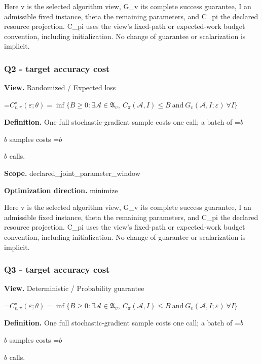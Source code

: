 \documentclass[10pt,a4paper]{article}
\newcommand{\AtlasMath}[1]{\par\begingroup\centering\setbox0=\hbox{$\displaystyle #1$}\ifdim\wd0>1.4\linewidth\typeout{ATLAS WIDE FORMULA: \the\wd0}\fi\ifdim\wd0>\linewidth\resizebox{\linewidth}{!}{\box0}\else\box0\fi\par\endgroup}
\newcommand{\AtlasInlineMath}[1]{\begingroup\setbox0=\hbox{$#1$}\ifdim\wd0>.4\linewidth\endgroup\AtlasMath{#1}\else\endgroup$#1$\fi}
\begin{document}
Here v is the selected algorithm view, G\_v its complete success guarantee, I an admissible fixed instance, theta the remaining parameters, and C\_pi the declared resource projection. C\_pi uses the view's fixed-path or expected-work budget convention, including initialization. No change of guarantee or scalarization is implicit.



\subsubsection{Q2 - target accuracy cost}


\textbf{View.} Randomized / Expected loss



\AtlasMath{C^\star_{v,\pi}(\varepsilon;\theta)=\inf\{B\ge0:\exists\mathcal A\in\mathfrak A_v,\ C_\pi(\mathcal A,I)\le B\ \text{and}\ G_v(\mathcal A,I;\varepsilon)\ \forall I\}}


\textbf{Definition.} One full stochastic-gradient sample costs one call; a batch of \AtlasInlineMath{b} samples costs \AtlasInlineMath{b} calls.



\textbf{Scope.} declared\_joint\_parameter\_window



\textbf{Optimization direction.} minimize



Here v is the selected algorithm view, G\_v its complete success guarantee, I an admissible fixed instance, theta the remaining parameters, and C\_pi the declared resource projection. C\_pi uses the view's fixed-path or expected-work budget convention, including initialization. No change of guarantee or scalarization is implicit.



\subsubsection{Q3 - target accuracy cost}


\textbf{View.} Deterministic / Probability guarantee



\AtlasMath{C^\star_{v,\pi}(\varepsilon;\theta)=\inf\{B\ge0:\exists\mathcal A\in\mathfrak A_v,\ C_\pi(\mathcal A,I)\le B\ \text{and}\ G_v(\mathcal A,I;\varepsilon)\ \forall I\}}


\textbf{Definition.} One full stochastic-gradient sample costs one call; a batch of \AtlasInlineMath{b} samples costs \AtlasInlineMath{b} calls.
\end{document}
